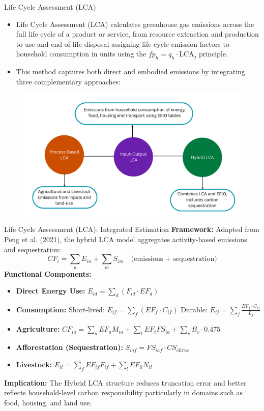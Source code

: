 \documentclass{beamer}
\begin{document}
\begin{frame}{Life Cycle Assessment (LCA)}
\footnotesize
\vspace{-2.5em}
\begin{itemize}
\item Life Cycle Assessment (LCA) calculates greenhouse gas emissions across the full life cycle of a product or service, from resource extraction and production to use and end-of-life disposal assigning life cycle emission factors to household consumption in units using the \textbf{$fp_h = q_h \cdot \text{LCA}_j$} principle. 
\pause
\item This method captures both direct and embodied emissions by integrating three complementary approaches:
\end{itemize}
\vspace{-0.5em}
\begin{figure}
\centering
\includegraphics[width=0.7\linewidth]{LCA Visual.png}
\end{figure}
\end{frame}

\begin{frame}{Life Cycle Assessment (LCA): Integrated Estimation}
\footnotesize
\vspace{-2.5em}
\textbf{Framework:}  
Adapted from Peng et al. (2021), the hybrid LCA model aggregates activity-based emissions and sequestration:
\pause
\[
CF_i = \sum_n E_{in} + \sum_m S_{im}
\quad \text{(emissions + sequestration)}
\]
\pause
\vspace{0.3em}
\textbf{Functional Components:}
\begin{itemize}
  \item \textbf{Direct Energy Use:} $E_{id} = \sum_d (F_{id} \cdot EF_d)$
  \pause
  \item \textbf{Consumption:} Short-lived: $E_{if} = \sum_f (EF_f \cdot C_{if})$  
        Durable: $E_{ij} = \sum_j \frac{EF_j \cdot C_{ij}}{L_j}$
  \pause
        \item \textbf{Agriculture:} $CF_{ia} = \sum_a EF_a M_{ia} + \sum_t EF_t FS_{ia} + \sum_v B_v \cdot 0.475$
  \pause
        \item \textbf{Afforestation (Sequestration):} $S_{iaf} = FS_{iaf} \cdot CS_{\text{citrus}}$
  \pause
        \item \textbf{Livestock:} $E_{il} = \sum_f EF_{if} F_{if} + \sum_l EF_{il} N_{il}$
\end{itemize}

\pause
\vspace{0.3em}
\textbf{Implication:}  
The Hybrid LCA structure reduces truncation error and better reflects household-level carbon responsibility particularly in domains such as food, housing, and land use.
\end{frame}
\end{document}
